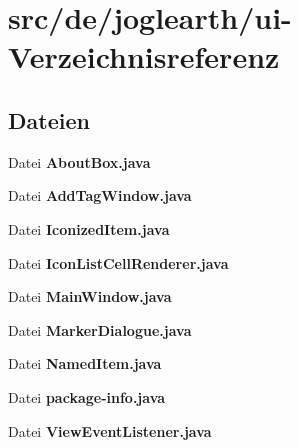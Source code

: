 \section{src/de/joglearth/ui-\/\-Verzeichnisreferenz}
\label{dir_4b274c199fc58ae06d55f08d9b9a949d}
\subsection*{Dateien}
\begin{DoxyCompactItemize}
\item 
Datei {\bfseries About\-Box.\-java}
\item 
Datei {\bfseries Add\-Tag\-Window.\-java}
\item 
Datei {\bfseries Iconized\-Item.\-java}
\item 
Datei {\bfseries Icon\-List\-Cell\-Renderer.\-java}
\item 
Datei {\bfseries Main\-Window.\-java}
\item 
Datei {\bfseries Marker\-Dialogue.\-java}
\item 
Datei {\bfseries Named\-Item.\-java}
\item 
Datei {\bfseries package-\/info.\-java}
\item 
Datei {\bfseries View\-Event\-Listener.\-java}
\end{DoxyCompactItemize}
